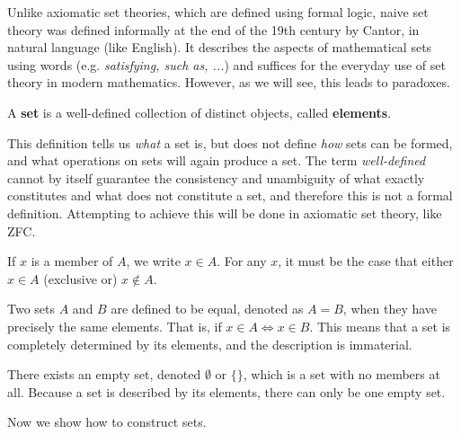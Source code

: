 \documentclass{article}
\begin{document}
    Unlike axiomatic set theories, which are defined using formal logic, naive set theory was defined informally at the end of the 19th century by Cantor, in natural language (like English). It describes the aspects of mathematical sets using words (e.g. \textit{satisfying, such as, ...}) and suffices for the everyday use of set theory in modern mathematics. However, as we will see, this leads to paradoxes. 

    \begin{definition}[Set]
      A \textbf{set} is a well-defined collection of distinct objects, called \textbf{elements}. 
    \end{definition}

    This definition tells us \textit{what} a set is, but does not define \textit{how} sets can be formed, and what operations on sets will again produce a set. The term \textit{well-defined} cannot by itself guarantee the consistency and unambiguity of what exactly constitutes and what does not constitute a set, and therefore this is not a formal definition. Attempting to achieve this will be done in axiomatic set theory, like ZFC. 

    \begin{definition}[Membership]
      If $x$ is a member of $A$, we write $x \in A$. For any $x$, it must be the case that either $x \in A$ (exclusive or) $x \not\in A$. 
    \end{definition}
    
    \begin{definition}[Equality]
      Two sets $A$ and $B$ are defined to be equal, denoted as $A = B$, when they have precisely the same elements. That is, if $x \in A \iff x \in B$. This means that a set is completely determined by its elements, and the description is immaterial. 
    \end{definition}

    \begin{definition}
      There exists an empty set, denoted $\emptyset$ or $\{\}$, which is a set with no members at all. Because a set is described by its elements, there can only be one empty set. 
    \end{definition}

    Now we show how to construct sets. 
\end{document}
